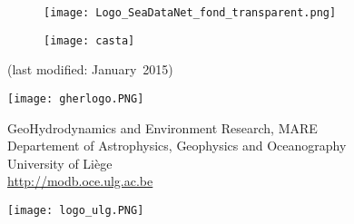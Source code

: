 \begin{titlepage}


\begin{figure}[H]
\centering
\texttt{[image: Logo\_SeaDataNet\_fond\_transparent.png]}
\end{figure}

\begin{center}
\vspace*{1cm}

\colorbox{grey}{
	\parbox[t]{1.0\linewidth}{
	\huge
		\printtitle 
		\vspace*{0.7cm}
	}
}

  	\vspace*{1cm}
  	
\printauthor								%

\vspace*{1cm}


\begin{figure}[H]
\centering
\texttt{[image: casta]}
\end{figure}

\normalsize{(last modified: January~2015)}

\vfill

\parbox{.20\textwidth}{
\flushleft
\texttt{[image: gherlogo.PNG]}
}\parbox{.60\textwidth}{
\centering
\vspace{.4cm}


\footnotesize{GeoHydrodynamics and Environment Research, MARE\\ 
Departement of Astrophysics, Geophysics and Oceanography\\
University of Li\`{e}ge\\ 
\url{http://modb.oce.ulg.ac.be}
}
\vspace{.15cm}
}\parbox{.20\textwidth}{
\flushright
\texttt{[image: logo\_ulg.PNG]}
}

\end{center}

\end{titlepage}

%
%

